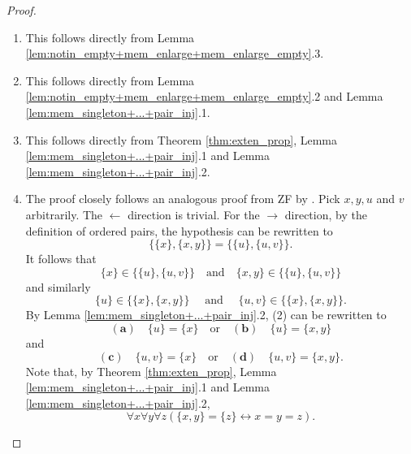\begin{proof}
    \leanok
    \leavevmode
    \begin{enumerate}
        \item This follows directly from Lemma 
        \ref{lem:notin_empty+mem_enlarge+mem_enlarge_empty}.3.
        \item This follows directly from 
        Lemma \ref{lem:notin_empty+mem_enlarge+mem_enlarge_empty}.2 and 
        Lemma \ref{lem:mem_singleton+...+pair_inj}.1.
        \item This follows directly from Theorem \ref{thm:exten_prop},
        Lemma \ref{lem:mem_singleton+...+pair_inj}.1 and 
        Lemma \ref{lem:mem_singleton+...+pair_inj}.2.
        \item  The proof closely follows an analogous proof from ZF by \cite{enderton1977elements}.
        Pick $x,y,u$ and $v$ arbitrarily. The $\leftarrow$ direction is trivial.
        For the $\rightarrow$ direction, by the definition of ordered pairs, 
        the hypothesis can be rewritten to
        \begin{equation*}
            \{\{x\}, \{x,y\}\} = \{\{u\}, \{u,v\}\}.
        \end{equation*}
        It follows that
        \begin{equation}
            \{x\} \in \{\{u\}, \{u,v\}\}\quad\text{and}\quad \{x,y\} \in \{\{u\}, \{u,v\}\}
        \end{equation}
        and similarly
        \begin{equation}
            \{u\} \in \{\{x\}, \{x,y\}\}\quad\text{ and }\quad \{u,v\} \in \{\{x\}, \{x,y\}\}.
        \end{equation}
        By Lemma \ref{lem:mem_singleton+...+pair_inj}.2, (2) can be rewritten to
        \begin{equation*}
            (\textbf{a})\quad\{u\}=\{x\}\quad\text{or}\quad (\textbf{b})\quad\{u\}=\{x,y\}
        \end{equation*}
        and
        \begin{equation*}
            (\textbf{c})\quad\{u,v\}=\{x\}\quad\text{or}\quad (\textbf{d})\quad\{u,v\}=\{x,y\}.
        \end{equation*}
        Note that, by Theorem \ref{thm:exten_prop}, Lemma \ref{lem:mem_singleton+...+pair_inj}.1 
        and Lemma \ref{lem:mem_singleton+...+pair_inj}.2,
        \begin{equation}
        \forall x \forall y \forall z (\{x,y\} = \{z\} \leftrightarrow x = y =z).
        \end{equation}

\end{enumerate}
\end{proof}
